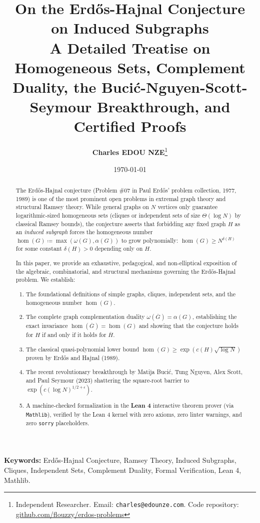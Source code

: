 \documentclass[11pt,a4paper]{article}
\title{\textbf{\Large On the Erd\H{o}s-Hajnal Conjecture on Induced Subgraphs}\\[0.5em]
\large A Detailed Treatise on Homogeneous Sets, Complement Duality, the Buci\'c-Nguyen-Scott-Seymour Breakthrough, and Certified Proofs}
\author{\textbf{Charles EDOU NZE}\thanks{Independent Researcher. Email: \texttt{charles@edounze.com}. Code repository: \href{https://github.com/flouzzy/erdos-problems}{github.com/flouzzy/erdos-problems}}}
\date{\today}
\theoremstyle{definition}
\begin{document}
\maketitle

\begin{abstract}
The Erd\H{o}s-Hajnal conjecture (Problem \#07 in Paul Erd\H{o}s' problem collection, 1977, 1989) is one of the most prominent open problems in extremal graph theory and structural Ramsey theory. While general graphs on $N$ vertices only guarantee logarithmic-sized homogeneous sets (cliques or independent sets of size $\Theta(\log N)$ by classical Ramsey bounds), the conjecture asserts that forbidding any fixed graph $H$ as an \emph{induced subgraph} forces the homogeneous number $\operatorname{hom}(G) \coloneqq \max(\omega(G), \alpha(G))$ to grow polynomially: $\operatorname{hom}(G) \ge N^{\delta(H)}$ for some constant $\delta(H) > 0$ depending only on $H$.

In this paper, we provide an exhaustive, pedagogical, and non-elliptical exposition of the algebraic, combinatorial, and structural mechanisms governing the Erd\H{o}s-Hajnal problem. We establish:
\begin{enumerate}
    \item The foundational definitions of simple graphs, cliques, independent sets, and the homogeneous number $\operatorname{hom}(G)$.
    \item The complete graph complementation duality $\omega(\overline{G}) = \alpha(G)$, establishing the exact invariance $\operatorname{hom}(\overline{G}) = \operatorname{hom}(G)$ and showing that the conjecture holds for $H$ if and only if it holds for $\overline{H}$.
    \item The classical quasi-polynomial lower bound $\operatorname{hom}(G) \ge \exp(c(H) \sqrt{\log N})$ proven by Erd\H{o}s and Hajnal (1989).
    \item The recent revolutionary breakthrough by Matija Buci\'c, Tung Nguyen, Alex Scott, and Paul Seymour (2023) shattering the square-root barrier to $\exp(c (\log N)^{1/2 + \epsilon})$.
    \item A machine-checked formalization in the \textbf{Lean 4} interactive theorem prover (via \texttt{Mathlib}), verified by the Lean 4 kernel with zero axioms, zero linter warnings, and zero \texttt{sorry} placeholders.
\end{enumerate}
\end{abstract}

\vspace{0.5em}
\noindent\textbf{Keywords:} Erd\H{o}s-Hajnal Conjecture, Ramsey Theory, Induced Subgraphs, Cliques, Independent Sets, Complement Duality, Formal Verification, Lean 4, Mathlib.
\end{document}
